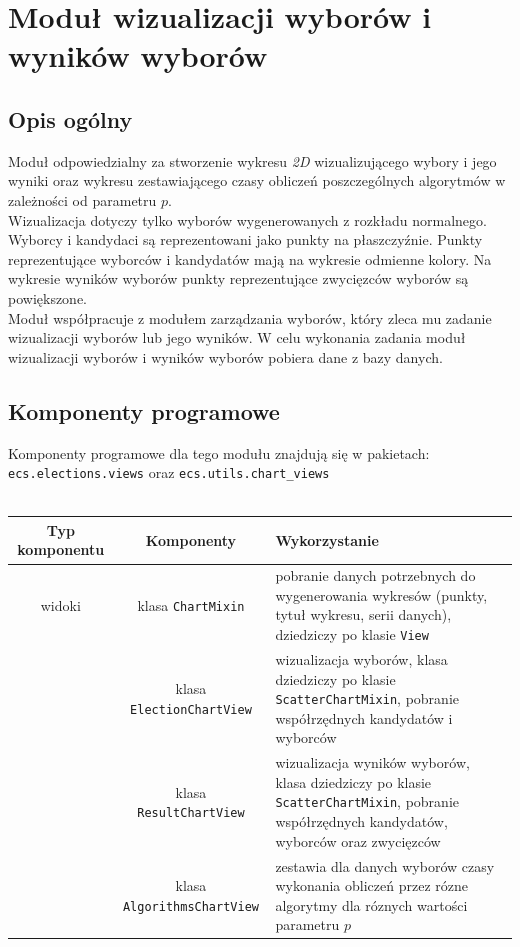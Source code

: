 \documentclass[pdflatex,11pt]{../aghdoc_version2}
\newcommand{\code}[1]{\texttt{#1}}
\begin{document}
\section{Moduł wizualizacji wyborów i wyników wyborów}
\subsection{Opis ogólny}
Moduł odpowiedzialny za stworzenie wykresu \textit{2D} wizualizującego wybory i jego wyniki
oraz wykresu zestawiającego czasy obliczeń poszczególnych algorytmów w zależności od parametru $p$.\\
Wizualizacja dotyczy tylko wyborów wygenerowanych z rozkładu normalnego.\\ Wyborcy i
kandydaci są reprezentowani jako punkty na płaszczyźnie. Punkty reprezentujące wyborców
i kandydatów mają na wykresie odmienne kolory. Na wykresie wyników wyborów punkty
reprezentujące zwycięzców wyborów są powiększone.\\ Moduł współpracuje z modułem
zarządzania wyborów, który zleca mu zadanie wizualizacji wyborów lub jego wyników. W
celu wykonania zadania moduł wizualizacji wyborów i wyników wyborów pobiera dane z
bazy danych.

\subsection{Komponenty programowe}
Komponenty programowe dla tego modułu znajdują się w pakietach:  \code{ecs.elections.views} oraz \code{ecs.utils.chart\_views} \\ \\
\begin{tabular}{|c|c|p{5cm}|}
\hline
\textbf{Typ komponentu} & \textbf{Komponenty} & \textbf{Wykorzystanie} \\
\hline
widoki & klasa \code{ChartMixin} & pobranie danych potrzebnych do
wygenerowania wykresów (punkty, tytuł
wykresu, serii danych), dziedziczy po
klasie \code{View} \\
\cline{2-3}
 & klasa \code{ElectionChartView} & wizualizacja wyborów, klasa dziedziczy
po klasie \code{ScatterChartMixin}, pobranie
współrzędnych kandydatów i wyborców \\
\cline{2-3}
 & klasa \code{ResultChartView} & wizualizacja wyników wyborów, klasa
dziedziczy po klasie \code{ScatterChartMixin},
pobranie współrzędnych kandydatów,
wyborców oraz zwycięzców \\
\cline{2-3}
& klasa \code{AlgorithmsChartView} & zestawia dla danych wyborów czasy wykonania obliczeń  przez rózne algorytmy dla róznych wartości parametru $p$\\
\hline

\end{tabular}
\clearpage
\end{document}
